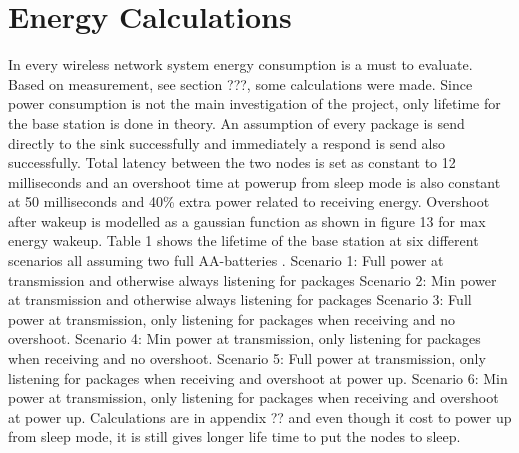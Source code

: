 \section{Energy Calculations}\label{sc:energyCalculations}

In every wireless network system energy consumption is a must to evaluate. Based on measurement, see section ???, some calculations were made. Since power consumption is not the main investigation of the project, only lifetime for the base station is done in theory. An assumption of every package is send directly to the sink successfully and immediately a respond is send also successfully. Total latency between the two nodes is set as constant to 12 milliseconds and an overshoot time at powerup from sleep mode is also constant at 50 milliseconds and 40\% extra power related to receiving energy. Overshoot after wakeup is modelled as a gaussian function as shown in figure 13 for max energy wakeup. Table 1 shows the lifetime of the base station at six different scenarios all assuming two full AA-batteries .
Scenario 1: Full power at transmission and otherwise always listening for packages
Scenario 2: Min power at transmission and otherwise always listening for packages
Scenario 3: Full power at transmission, only listening for packages when receiving and no overshoot.
Scenario 4: Min power at transmission, only listening for packages when receiving and no overshoot.
Scenario 5: Full power at transmission, only listening for packages when receiving and overshoot at power up.
Scenario 6: Min power at transmission, only listening for packages when receiving and overshoot at power up.
Calculations are in appendix ?? and even though it cost to power up from sleep mode, it is still gives longer life time to put the nodes to sleep.

